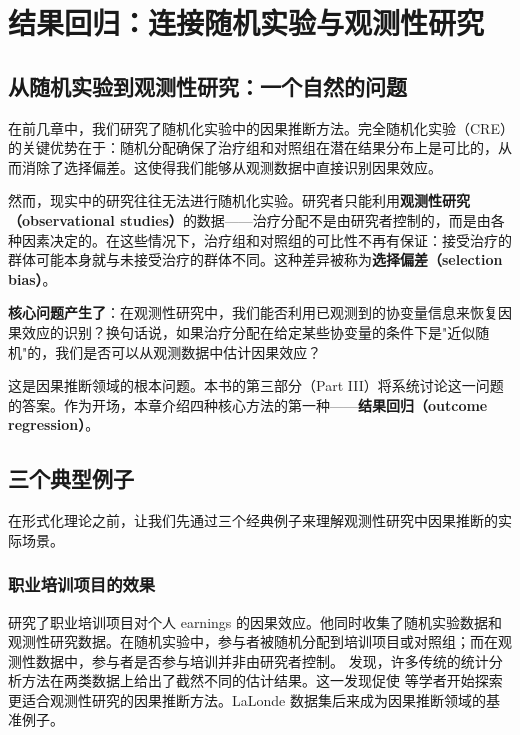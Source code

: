 
\chapter{结果回归：连接随机实验与观测性研究}\label{ch:10}

\section{从随机实验到观测性研究：一个自然的问题}

在前几章中，我们研究了随机化实验中的因果推断方法。完全随机化实验（CRE）的关键优势在于：随机分配确保了治疗组和对照组在潜在结果分布上是可比的，从而消除了选择偏差。这使得我们能够从观测数据中直接识别因果效应。

然而，现实中的研究往往无法进行随机化实验。研究者只能利用\textbf{观测性研究（observational studies）}的数据——治疗分配不是由研究者控制的，而是由各种因素决定的。在这些情况下，治疗组和对照组的可比性不再有保证：接受治疗的群体可能本身就与未接受治疗的群体不同。这种差异被称为\textbf{选择偏差（selection bias）}。

\textbf{核心问题产生了}：在观测性研究中，我们能否利用已观测到的协变量信息来恢复因果效应的识别？换句话说，如果治疗分配在给定某些协变量的条件下是"近似随机"的，我们是否可以从观测数据中估计因果效应？

这是因果推断领域的根本问题。本书的第三部分（Part III）将系统讨论这一问题的答案。作为开场，本章介绍四种核心方法的第一种——\textbf{结果回归（outcome regression）}。

\section{三个典型例子}\label{sec:10-motivating-examples}

在形式化理论之前，让我们先通过三个经典例子来理解观测性研究中因果推断的实际场景。

\subsection{职业培训项目的效果}\label{sec:10-job-training}\label{sec:10-3}

\citet{LaLonde:1986} 研究了职业培训项目对个人 earnings 的因果效应。他同时收集了随机实验数据和观测性研究数据。在随机实验中，参与者被随机分配到培训项目或对照组；而在观测性数据中，参与者是否参与培训并非由研究者控制。\citet{LaLonde:1986} 发现，许多传统的统计分析方法在两类数据上给出了截然不同的估计结果。这一发现促使 \citet{Dehejia:1999} 等学者开始探索更适合观测性研究的因果推断方法。LaLonde 数据集后来成为因果推断领域的基准例子。

